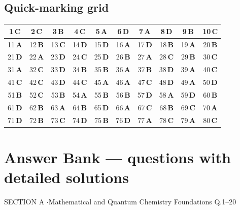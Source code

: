 \documentclass[11pt,a4paper]{article}
\begin{document}
\subsection*{Quick-marking grid}
\begin{center}\renewcommand{\arraystretch}{1.3}
\begin{tabular}{|c|c|c|c|c|c|c|c|c|c|}\hline
1\,\textbf{C} & 2\,\textbf{C} & 3\,\textbf{B} & 4\,\textbf{C} & 5\,\textbf{A} & 6\,\textbf{D} & 7\,\textbf{A} & 8\,\textbf{D} & 9\,\textbf{B} & 10\,\textbf{C} \\
\hline
11\,\textbf{A} & 12\,\textbf{B} & 13\,\textbf{C} & 14\,\textbf{D} & 15\,\textbf{D} & 16\,\textbf{A} & 17\,\textbf{D} & 18\,\textbf{B} & 19\,\textbf{A} & 20\,\textbf{B} \\
\hline
21\,\textbf{D} & 22\,\textbf{A} & 23\,\textbf{D} & 24\,\textbf{C} & 25\,\textbf{D} & 26\,\textbf{B} & 27\,\textbf{A} & 28\,\textbf{C} & 29\,\textbf{B} & 30\,\textbf{C} \\
\hline
31\,\textbf{A} & 32\,\textbf{C} & 33\,\textbf{D} & 34\,\textbf{B} & 35\,\textbf{B} & 36\,\textbf{A} & 37\,\textbf{B} & 38\,\textbf{D} & 39\,\textbf{A} & 40\,\textbf{C} \\
\hline
41\,\textbf{C} & 42\,\textbf{C} & 43\,\textbf{D} & 44\,\textbf{C} & 45\,\textbf{A} & 46\,\textbf{A} & 47\,\textbf{C} & 48\,\textbf{D} & 49\,\textbf{A} & 50\,\textbf{D} \\
\hline
51\,\textbf{B} & 52\,\textbf{C} & 53\,\textbf{B} & 54\,\textbf{A} & 55\,\textbf{B} & 56\,\textbf{B} & 57\,\textbf{D} & 58\,\textbf{A} & 59\,\textbf{D} & 60\,\textbf{B} \\
\hline
61\,\textbf{D} & 62\,\textbf{B} & 63\,\textbf{A} & 64\,\textbf{B} & 65\,\textbf{D} & 66\,\textbf{A} & 67\,\textbf{C} & 68\,\textbf{B} & 69\,\textbf{C} & 70\,\textbf{A} \\
\hline
71\,\textbf{D} & 72\,\textbf{B} & 73\,\textbf{C} & 74\,\textbf{D} & 75\,\textbf{B} & 76\,\textbf{D} & 77\,\textbf{A} & 78\,\textbf{C} & 79\,\textbf{A} & 80\,\textbf{C} \\
\hline\end{tabular}\end{center}
\newpage
\section*{Answer Bank --- questions with detailed solutions}\label{bank}

\begin{sectionbanner}SECTION A \enspace$\cdot$\enspace Mathematical and Quantum Chemistry Foundations \hfill Q.1--20\end{sectionbanner}
\end{document}
